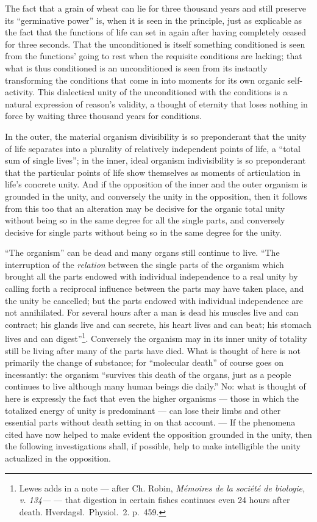 \documentclass[12pt,a4paper]{book}
\begin{document}
The fact that a grain of wheat can lie for three thousand years and still
preserve its ``germinative power'' is, when
it is seen in the principle, just as explicable as the fact that the functions
of life can set in again after having completely ceased for three seconds. That
the unconditioned is itself something conditioned is seen from the functions'
going to rest when the requisite conditions are lacking; that what is thus
conditioned is an unconditioned is seen from its instantly transforming the
conditions that come in into moments for its own organic self-activity. This
dialectical unity of the unconditioned with the conditions is a natural
expression of reason's validity, a thought of eternity that loses nothing in
force by waiting three thousand years for conditions.

In the outer, the material organism divisibility is so preponderant that the
unity of life separates into a plurality of relatively independent points of
life, a ``total sum of single lives''; in the inner, ideal organism
indivisibility is so preponderant that the particular points of life show
themselves as moments of articulation in life's concrete unity. And if the
opposition of the inner and the outer organism is grounded in the unity, and
conversely the unity in the opposition, then it follows from this too that an
alteration may be decisive for the organic total unity without being so in the
same degree for all the single parts, and conversely decisive for single parts
without being so in the same degree for the unity.

``The organism'' can be dead and many organs still continue to live. ``The
interruption of the \emph{relation} between the single parts of the organism
which brought all the parts endowed with individual independence to a real
unity by calling forth a reciprocal influence between the parts may have taken
place, and the unity be cancelled; but the parts endowed with individual
independence are not annihilated. For several hours after a man is dead his
muscles live and can contract; his glands live and can secrete, his heart lives
and can beat; his stomach lives and
\setcounter{footnote}{0}
can digest''\footnote{Lewes adds in a note --- after Ch. Robin,
\textit{Mémoires de la société de biologie, v. 134---} --- that digestion in
certain fishes continues even 24 hours after death. Hverdagsl.\ Physiol.\ 2.
p.~459.}. Conversely the organism may in its inner unity of totality still be
living after many of the parts have died. What is thought of here is not
primarily the change of substance; for ``molecular death'' of course goes on
incessantly: the organism ``survives this death of the organs, just as a people
continues to live although many human beings die daily.'' No: what is thought
of here is expressly the fact that even the higher organisms --- those in which
the totalized energy of unity is predominant --- can lose their limbs and other
essential parts without death setting in on that account. --- If the phenomena
cited have now helped to make evident the opposition grounded in the unity,
then the following investigations shall, if possible, help to make intelligible
the unity actualized in the opposition.
\end{document}

